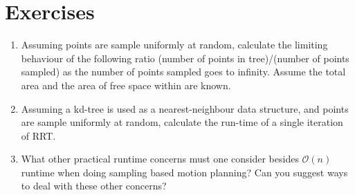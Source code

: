 \section*{Exercises}\small
\begin{enumerate}
\item Assuming points are sample uniformly at random, calculate the limiting behaviour of the following ratio   (number of points in tree)/(number of points sampled) as the number of points sampled goes to infinity. Assume the total area and the area of free space within are known. 

\item Assuming a kd-tree is used as a nearest-neighbour data structure, and points are sample uniformly at random, calculate the  run-time of a single iteration of RRT.

\item What other practical runtime concerns must one consider besides $\mathcal{O}(n)$ runtime when doing sampling based motion planning? Can you suggest ways to deal with these other concerns?
\end{enumerate}

\normalsize